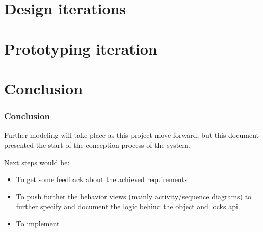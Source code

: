 \documentclass[a4paper,11pt]{article}
\author{%
    Léo-Nils Boissier \\
    \url{github.com/leonils}
}
\begin{document}


\tableofcontents
\newpage


% 
% 
% 
% 
% 
% 

% 
% 
% 
% 
% 
% 
% 

\newpage
\part{Design iterations}










\newpage
\part{Prototyping iteration}






\newpage
\part{Conclusion}
\section{Conclusion}
Further modeling will take place as this project move forward, but this document presented the start of the conception process of the system.

Next steps would be:

\begin{itemize}
    \item To get some feedback about the achieved requirements
    \item To push further the behavior views (mainly activity/sequence diagrams) to further specify and document the logic behind the object and locks api.
    \item To implement
\end{itemize}
\end{document}
